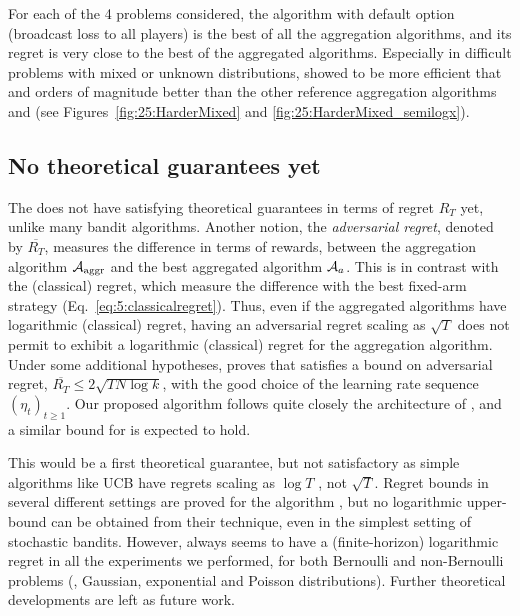 For each of the 4 problems considered, the \Aggr{} algorithm with default option (broadcast loss to all players) is the best of all the aggregation algorithms,
and its regret is very close to the best of the aggregated algorithms.
Especially in difficult problems with mixed or unknown distributions, \Aggr{} showed to be more efficient that \ExpQ{} and orders of magnitude better than the other reference aggregation algorithms \LearnExp{} and \CORRAL{} (see Figures~\ref{fig:25:HarderMixed} and \ref{fig:25:HarderMixed_semilogx}).


\subsection{No theoretical guarantees yet}\label{sub:25:theory}

The \Aggr{} does not have satisfying theoretical guarantees in terms of regret $R_T$ yet, unlike many bandit algorithms.
%
Another notion, the \emph{adversarial regret}, denoted by $\overline{R_T}$,
measures the difference in terms of rewards,
between the aggregation algorithm $\mathcal{A}_{\mathrm{aggr}}$ and the best aggregated algorithm $\mathcal{A}_a$. This is in contrast with the (classical) regret, which measure the difference with the best fixed-arm strategy (Eq.~\eqref{eq:5:classicalregret}). Thus,  even if the aggregated algorithms have logarithmic (classical) regret, having an adversarial regret scaling as $\sqrt{T}$ does not permit to exhibit a logarithmic (classical) regret for the aggregation algorithm.
%
%
Under some additional hypotheses,
\cite[Theorem 4.2]{Bubeck12} proves that
\ExpQ{} satisfies a bound on adversarial regret, %
$\overline{R_T} \leq 2 \sqrt{T N \log{k}}$,
with the good choice of the learning rate sequence $(\eta_t)_{t \geq 1}$.
Our proposed algorithm follows quite closely the architecture of \ExpQ,
and a similar bound for \Aggr{} is expected to hold.
%

This would be a first theoretical guarantee, but not satisfactory as simple algorithms like UCB have regrets scaling as $\log{T}$ \cite{Auer02,Bubeck12}, not $\sqrt{T}$.
%
Regret bounds in several different settings are proved for the \CORRAL{} algorithm \cite{Agarwal16}, but no logarithmic upper-bound can be obtained from their technique, even in the simplest setting of stochastic bandits.
%
However, \Aggr{} always seems to have a (finite-horizon) logarithmic regret in all the experiments we performed,
for both Bernoulli and non-Bernoulli problems (\eg, Gaussian, exponential and Poisson distributions).
Further theoretical developments are left as future work.


